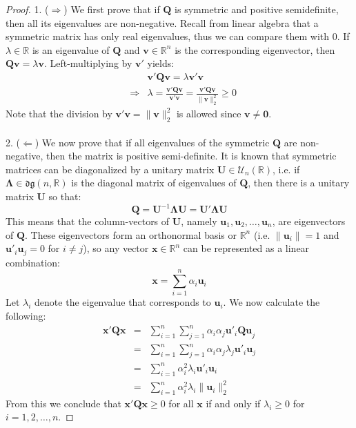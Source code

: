 \documentclass[a4paper,10pt,oneside]{book}
\begin{document}
\begin{proof}
 1. ($\Rightarrow$) We first prove that if $\mathbf{Q}$ is symmetric and positive semidefinite, then all its eigenvalues are non-negative. Recall from linear algebra that a symmetric matrix has only real eigenvalues, thus we can compare them with $0$. If $\lambda\in\mathbb{R}$ is an eigenvalue of $\mathbf{Q}$ and $\mathbf{v}\in\mathbb{R}^n$ is the corresponding eigenvector, then $\mathbf{Qv}=\lambda\mathbf{v}$. Left-multiplying by $\mathbf{v}'$ yields:
 \begin{eqnarray}
  &&\mathbf{v}'\mathbf{Qv}=\lambda\mathbf{v}'\mathbf{v}\\
&\Rightarrow& \lambda=\frac{\mathbf{v}'\mathbf{Qv}}{\mathbf{v}'\mathbf{v}}=\frac{\mathbf{v}'\mathbf{Qv}}{\|\mathbf{v}\|_2^2}\geq 0
 \end{eqnarray}
Note that the division by $\mathbf{v}'\mathbf{v}=\|\mathbf{v}\|_2^2$ is allowed since $\mathbf{v}\neq \mathbf{0}$.\\
\\
2. ($\Leftarrow$) We now prove that if all eigenvalues of the symmetric $\mathbf{Q}$ are non-negative, then the matrix is positive semi-definite. It is known that symmetric matrices can be diagonalized by a unitary matrix $\mathbf{U}\in\mathcal{U}_n(\mathbb{R})$, i.e. if $\mathbf{\Lambda}\in\mathfrak{dg}(n,\mathbb{R})$ is the diagonal matrix of eigenvalues of $\mathbf{Q}$, then there is a unitary matrix $\mathbf{U}$ so that:
\begin{equation}
 \mathbf{Q}=\mathbf{U}^{-1}\mathbf{\Lambda U}=\mathbf{U}'\mathbf{\Lambda U}
\end{equation}
 This means that the column-vectors of $\mathbf{U}$, namely $\mathbf{u}_1,\mathbf{u}_2,\ldots,\mathbf{u}_n$, are eigenvectors of $\mathbf{Q}$. These eigenvectors form an orthonormal basis or $\mathbb{R}^n$ (i.e. $\|\mathbf{u}_i\|=1$ and $\mathbf{u}'_i\mathbf{u}_j=0$ for $i\neq j$), so any vector $\mathbf{x}\in\mathbb{R}^n$ can be represented as a linear combination:
\begin{equation}
 \mathbf{x}=\sum_{i=1}^n\alpha_i\mathbf{u}_i
\end{equation}
 Let $\lambda_i$ denote the eigenvalue that corresponds to $\mathbf{u}_i$. We now calculate the following:
\begin{eqnarray}
 \mathbf{x}'\mathbf{Qx}&=&\sum_{i=1}^n\sum_{j=1}^n\alpha_i\alpha_j\mathbf{u}'_i\mathbf{Qu}_j\\
&=&\sum_{i=1}^n\sum_{j=1}^n\alpha_i\alpha_j\lambda_j\mathbf{u}'_i\mathbf{u}_j\\
&=&\sum_{i=1}^n\alpha_i^2\lambda_i\mathbf{u}'_i\mathbf{u}_i\\
&=&\sum_{i=1}^n\alpha_i^2\lambda_i\|\mathbf{u}_i\|_2^2
\end{eqnarray}
From this we conclude that $\mathbf{x}'\mathbf{Qx}\geq 0$ for all $\mathbf{x}$ if and only if $\lambda_i\geq 0$ for $i=1,2,\ldots,n$.
\end{proof}
\end{document}
